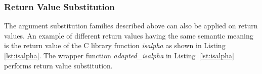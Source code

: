 \subsubsection{Return Value Substitution}
The argument substitution families described above can also be applied on return values.
%
An example of different return values having the same semantic meaning is the return value of the C library function \textit{isalpha} as shown in Listing \ref{lst:isalpha}.
%
The wrapper function \textit{adapted\_isalpha} in Listing~\ref{lst:isalpha} performs
return value substitution.
%
%
%
%
%
%
%


